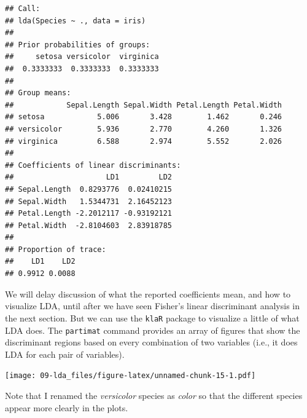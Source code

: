 \documentclass[
]{book}
\newenvironment{Shaded}{\begin{snugshade}}{\end{snugshade}}
\newcommand{\AttributeTok}[1]{\textcolor[rgb]{0.77,0.63,0.00}{#1}}
\newcommand{\FunctionTok}[1]{\textcolor[rgb]{0.00,0.00,0.00}{#1}}
\newcommand{\NormalTok}[1]{#1}
\newcommand{\OtherTok}[1]{\textcolor[rgb]{0.56,0.35,0.01}{#1}}
\newcommand{\SpecialCharTok}[1]{\textcolor[rgb]{0.00,0.00,0.00}{#1}}
\newcommand{\StringTok}[1]{\textcolor[rgb]{0.31,0.60,0.02}{#1}}
\theoremstyle{definition}
\theoremstyle{definition}
\theoremstyle{definition}
\theoremstyle{definition}
\theoremstyle{remark}
\begin{document}
\begin{verbatim}
## Call:
## lda(Species ~ ., data = iris)
## 
## Prior probabilities of groups:
##     setosa versicolor  virginica 
##  0.3333333  0.3333333  0.3333333 
## 
## Group means:
##            Sepal.Length Sepal.Width Petal.Length Petal.Width
## setosa            5.006       3.428        1.462       0.246
## versicolor        5.936       2.770        4.260       1.326
## virginica         6.588       2.974        5.552       2.026
## 
## Coefficients of linear discriminants:
##                     LD1         LD2
## Sepal.Length  0.8293776  0.02410215
## Sepal.Width   1.5344731  2.16452123
## Petal.Length -2.2012117 -0.93192121
## Petal.Width  -2.8104603  2.83918785
## 
## Proportion of trace:
##    LD1    LD2 
## 0.9912 0.0088
\end{verbatim}

We will delay discussion of what the reported coefficients mean, and how to visualize LDA, until after we have seen Fisher's linear discriminant analysis in the next section. But we can use the \texttt{klaR} package to visualize a little of what LDA does. The \texttt{partimat} command provides an array of figures that show the discriminant regions based on every combination of two variables (i.e., it does LDA for each pair of variables).

\begin{Shaded}
\end{Shaded}

\texttt{[image: 09-lda\_files/figure-latex/unnamed-chunk-15-1.pdf]}

Note that I renamed the \emph{versicolor} species as \emph{color} so that the different species appear more clearly in the plots.
\end{document}
